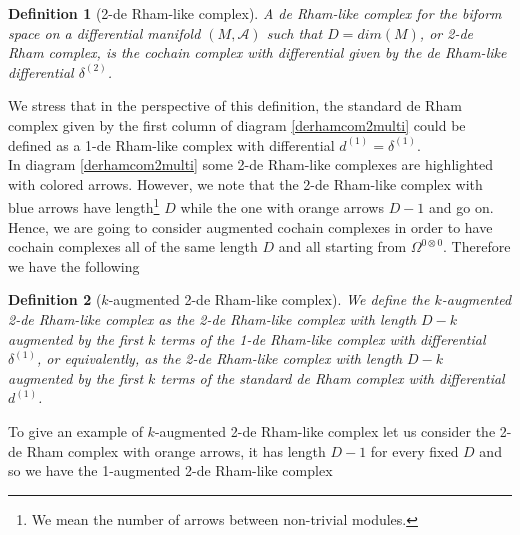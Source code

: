 \documentclass[a4paper,12pt]{article}
\newtheorem{Definition}{Definition}[section]
\begin{document}
\begin{Definition}[2-de Rham-like complex]
    A de Rham-like complex for the biform space on a differential manifold $(M,\mathcal{A})$ such that $D=dim(M)$, or 2-de Rham complex, is the cochain complex with differential given by the de Rham-like differential $\delta^{(2)}$.
\end{Definition}
We stress that in the perspective of this definition, the standard de Rham complex given by the first column of diagram \ref{derhamcom2multi} could be defined as a 1-de Rham-like complex with differential $d^{(1)}=\delta^{(1)}$. \\
In diagram \ref{derhamcom2multi} some 2-de Rham-like complexes are highlighted with colored arrows. However, we note that the 2-de Rham-like complex with blue arrows have length\footnote{We mean the number of arrows between non-trivial modules.} $D$ while the one with orange arrows $D-1$ and go on. Hence, we are going to consider augmented cochain complexes in order to have cochain complexes all of the same length $D$ and all starting from $\Omega^{0 \otimes 0}$. Therefore we have the following 
\begin{Definition}[$k$-augmented 2-de Rham-like complex]
  We define the $k$-augmented 2-de Rham-like complex as the 2-de Rham-like complex with length $D-k$ augmented by the first $k$ terms of the  1-de Rham-like complex with differential $\delta^{(1)}$, or equivalently, as the 2-de Rham-like complex with length $D-k$ augmented by the first $k$ terms of the standard de Rham complex with differential $d^{(1)}$.
\end{Definition}
To give an example of $k$-augmented 2-de Rham-like complex let us consider the 2-de Rham complex with orange arrows, it has length $D-1$ for every fixed $D$ and so we have the 
1-augmented 2-de Rham-like complex
\end{document}
